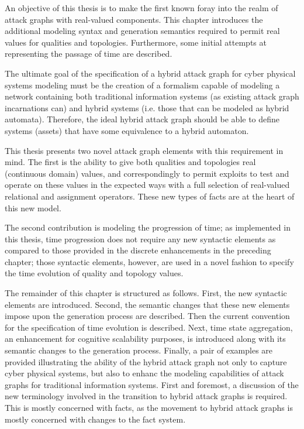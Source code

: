 An objective of this thesis is to make the first known foray into the realm of
attack graphs with real-valued components. This chapter introduces the additional
modeling syntax and generation semantics required to permit real values for
qualities and topologies. Furthermore, some initial attempts at representing
the passage of time are described. 

The ultimate goal of the specification of a hybrid attack graph for cyber
physical systems modeling must be the creation of a formalism capable of
modeling a network containing both traditional information systems (as
existing attack graph incarnations can) and hybrid systems (i.e. those that
can be modeled as hybrid automata). Therefore, the ideal hybrid attack graph
should be able to define systems (assets) that have some equivalence to a
hybrid automaton.

This thesis presents two novel attack graph elements with this requirement
in mind. The first is the ability to give both qualities and topologies
real (continuous domain) values, and correspondingly to permit exploits to
test and operate on these values in the expected ways with a full selection of
real-valued relational and assignment operators. These new types of facts are 
at the heart of this new model. 

The second contribution is modeling the progression
of time; as implemented in this thesis, time progression does not require any
new syntactic elements as compared to those provided in the discrete 
enhancements in the preceding chapter; those syntactic elements, however, are
used in a novel fashion to specify the
time evolution of quality and topology values.

The remainder of this chapter is structured as follows. First, the new
syntactic elements are introduced. Second, the semantic changes that these new
elements impose upon the generation process are described. Then the current
convention for the specification of time evolution is described. Next, 
time state aggregation, an enhancement for cognitive scalability purposes,
is introduced along with its semantic changes to the generation process.
Finally, a pair of examples are provided illustrating the ability of the
hybrid attack graph not only to capture cyber physical systems, but also to
enhanc the modeling capabilities of attack graphs for traditional information
systems.
First and foremost, a discussion of the new terminology involved in the
transition to hybrid attack graphs is required. This is mostly concerned with
facts, as the movement to hybrid attack graphs is mostly concerned with changes
to the fact system.

